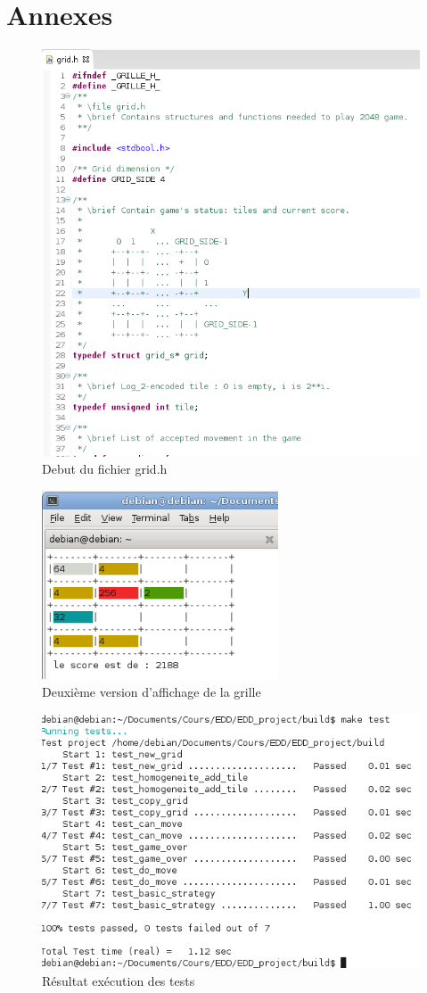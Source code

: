 \documentclass[12pt]{article}
\begin{document}
\newpage
\section{Annexes}
\listoffigures
\begin{figure}
   \caption{\label{grid_h} Debut du fichier grid.h}
   \includegraphics[scale=0.6]{grid_h.png}
\end{figure}

\begin{figure}
   \caption{\label{grille_couleur} Deuxi\`eme version d'affichage de la grille}
   \includegraphics[width=7cm]{grille_couleur.png}
\end{figure}

\begin{figure}
   \caption{\label{test} R\'esultat ex\'ecution des tests}
   \includegraphics[scale=0.6]{test.png}
\end{figure}
\end{document}
